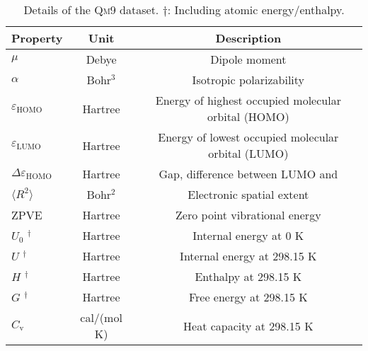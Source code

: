 \documentclass[letterpaper]{article}
\theoremstyle{definition}
\begin{document}
\begin{table*}
	\caption{Details of the  \textsc{Qm9} dataset. $\dagger$: Including atomic energy/enthalpy.
	}\label{fig:qm9_details}
	\renewcommand{\arraystretch}{1.0}
	\centering
	\begin{tabular}{lcc}
		\toprule
		\textbf{Property} & \textbf{Unit} & \textbf{Description} \\
		\midrule
		$\mu$                       & Debye   &     Dipole moment  \\
		$\alpha$                    &  Bohr$^3$   &    Isotropic polarizability \\
		$\varepsilon_{\text{HOMO}}$ & Hartree &     Energy of highest occupied molecular
		orbital (HOMO)  \\
		$\varepsilon_{\text{LUMO}}$ &  Hartree  &    Energy of lowest occupied molecular
		orbital (LUMO)     \\
		$\Delta\varepsilon_{\text{HOMO}}$         &  Hartree  &    Gap, difference between LUMO and \\
		$\langle R^2 \rangle$       &Bohr$^2$  &    Electronic spatial extent                \\
		\textsc{ZPVE}               &Hartree  &    Zero point vibrational energy    \\
		$U_0$    $^\dagger$                  &Hartree &     Internal energy at 0 K  \\
		$U$      $^\dagger$                   &Hartree   &   Internal energy at 298.15 K  \\
		$H$      $^\dagger$                   &Hartree     & Enthalpy at 298.15 K  \\
		$G$      $^\dagger$                   &Hartree     & Free energy at 298.15 K
		 \\
		$C_{\text{v}}$              & cal/(mol K)&  Heat capacity at 298.15 K   \\
		\bottomrule
	\end{tabular}
\end{table*}
\end{document}
